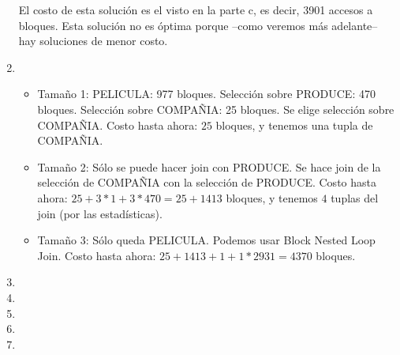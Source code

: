 \documentclass[10pt]{article}
\begin{document}
\begin{enumerate}
El costo de esta solución es el visto en la parte c, es decir, 3901 accesos a bloques.
Esta solución no es óptima porque --como veremos más adelante-- hay soluciones de menor costo.

 \item

\begin{itemize}
 \item Tamaño 1: PELICULA: 977 bloques. Selección sobre PRODUCE: 470 bloques. Selección sobre COMPAÑIA: 25 bloques.
       Se elige selección sobre COMPAÑIA. Costo hasta ahora: $25$ bloques, y tenemos una tupla de COMPAÑIA.
 \item Tamaño 2: Sólo se puede hacer join con PRODUCE. Se hace join de la selección de COMPAÑIA con la selección de PRODUCE.
       Costo hasta ahora: $25+3*1+3*470=25+1413$ bloques, y tenemos $4$ tuplas del join (por las estadísticas).
 \item Tamaño 3: Sólo queda PELICULA. Podemos usar Block Nested Loop Join. Costo hasta ahora: $25+1413+1+1*2931=4370$ bloques.
\end{itemize}

 \item

 \item

 \item

 \item

 \item

\end{enumerate}
\end{document}
